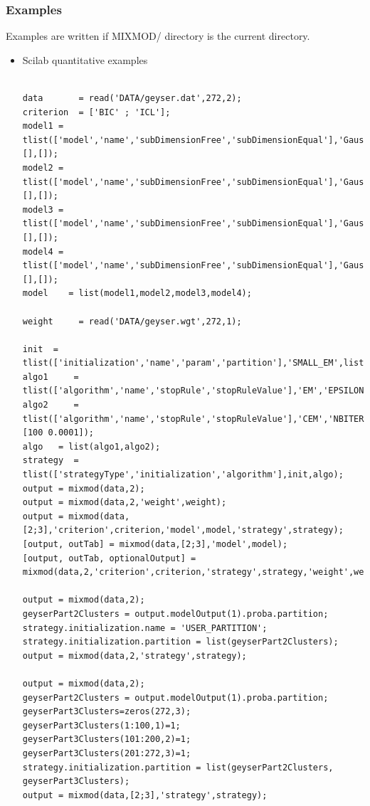 \subsubsection{Examples}
Examples are written if MIXMOD/ directory is the current directory.
\begin{itemize}
	\item Scilab quantitative examples\\



{\scriptsize
\begin{verbatim}

data       = read('DATA/geyser.dat',272,2);
criterion  = ['BIC' ; 'ICL'];
model1 = tlist(['model','name','subDimensionFree','subDimensionEqual'],'Gaussian_p_L_I',[],[]);
model2 = tlist(['model','name','subDimensionFree','subDimensionEqual'],'Gaussian_p_Lk_I',[],[]);
model3 = tlist(['model','name','subDimensionFree','subDimensionEqual'],'Gaussian_pk_L_I',[],[]);
model4 = tlist(['model','name','subDimensionFree','subDimensionEqual'],'Gaussian_pk_Lk_I',[],[]);
model    = list(model1,model2,model3,model4);

weight     = read('DATA/geyser.wgt',272,1);

init  = tlist(['initialization','name','param','partition'],'SMALL_EM',list(),list());
algo1     = tlist(['algorithm','name','stopRule','stopRuleValue'],'EM','EPSILON',0.0001);
algo2     = tlist(['algorithm','name','stopRule','stopRuleValue'],'CEM','NBITERATION_EPSILON',[100 0.0001]);
algo   = list(algo1,algo2);
strategy  = tlist(['strategyType','initialization','algorithm'],init,algo);
output = mixmod(data,2);
output = mixmod(data,2,'weight',weight);
output = mixmod(data,[2;3],'criterion',criterion,'model',model,'strategy',strategy);
[output, outTab] = mixmod(data,[2;3],'model',model);
[output, outTab, optionalOutput] = mixmod(data,2,'criterion',criterion,'strategy',strategy,'weight',weight);

output = mixmod(data,2);
geyserPart2Clusters = output.modelOutput(1).proba.partition;
strategy.initialization.name = 'USER_PARTITION';
strategy.initialization.partition = list(geyserPart2Clusters);
output = mixmod(data,2,'strategy',strategy);

output = mixmod(data,2);
geyserPart2Clusters = output.modelOutput(1).proba.partition;
geyserPart3Clusters=zeros(272,3);
geyserPart3Clusters(1:100,1)=1;
geyserPart3Clusters(101:200,2)=1;
geyserPart3Clusters(201:272,3)=1;
strategy.initialization.partition = list(geyserPart2Clusters, geyserPart3Clusters);
output = mixmod(data,[2;3],'strategy',strategy);


\end{verbatim}}
\end{itemize}
